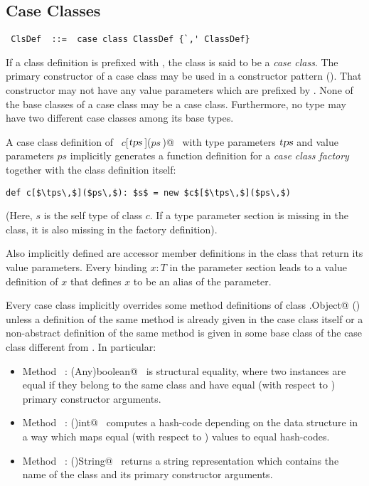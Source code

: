 \documentclass[a4paper,12pt,twoside,titlepage]{book}
\newcommand{\tps}{\mbox{\sl tps}}
\begin{document}
\subsection{Case Classes}
\label{sec:case-classes}

\syntax\begin{lstlisting} ClsDef  ::=  case class ClassDef {`,' ClassDef}
\end{lstlisting}

If a class definition is prefixed with , the class is said
to be a {\em case class}.  The primary constructor of a case class may
be used in a constructor pattern ().  That
constructor may not have any value parameters which are prefixed by
.  None of the base classes of a case class may be a case
class. Furthermore, no type may have two different case classes among
its base types.

A case class definition of ~\lstinline@$c$[$\tps\,$]($ps\,$)@~ with type
parameters $\tps$ and value parameters $ps$ implicitly
generates a function definition for a {\em case class factory}
together with the class definition itself:
\begin{lstlisting}
def c[$\tps\,$]($ps\,$): $s$ = new $c$[$\tps\,$]($ps\,$)
\end{lstlisting}
(Here, $s$ is the self type of class $c$. 
If a type parameter section
is missing in the class, it is also missing in the factory
definition).  

Also implicitly defined are accessor member definitions
in the class that return its value parameters. Every binding
$x: T$ in the parameter section leads to a value definition of
$x$ that defines $x$ to be an alias of the parameter.  

Every case class implicitly overrides some method definitions of class
\lstinline@scala.Object@ () unless a definition of the same
method is already given in the case class itself or a non-abstract
definition of the same method is given in some base class of the case
class different from . In particular:
\begin{itemize}
\item[] Method ~\lstinline@equals: (Any)boolean@~ is structural equality, where two
instances are equal if they belong to the same class and
have equal (with respect to ) primary constructor arguments.
\item[] Method ~\lstinline@hashCode: ()int@~ computes a hash-code
depending on the data structure in a way which maps equal (with respect to
) values to equal hash-codes.
\item[] Method ~\lstinline@toString: ()String@~ returns a string representation which
contains the name of the class and its primary constructor arguments.
\end{itemize}
\end{document}
